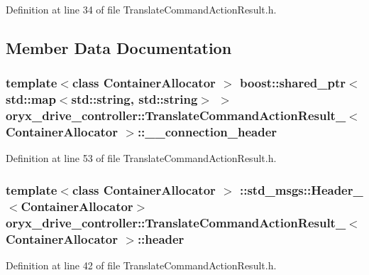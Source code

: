 \-Definition at line 34 of file \-Translate\-Command\-Action\-Result.\-h.



\subsection{\-Member \-Data \-Documentation}
\subsubsection[{\-\_\-\-\_\-connection\-\_\-header}]{\setlength{\rightskip}{0pt plus 5cm}template$<$class Container\-Allocator $>$ boost\-::shared\-\_\-ptr$<$std\-::map$<$std\-::string, std\-::string$>$ $>$ {\bf oryx\-\_\-drive\-\_\-controller\-::\-Translate\-Command\-Action\-Result\-\_\-}$<$ \-Container\-Allocator $>$\-::{\bf \-\_\-\-\_\-connection\-\_\-header}}\label{structoryx__drive__controller_1_1TranslateCommandActionResult___a2de868eddb82fbd2fc2aab0fb01526a1}


\-Definition at line 53 of file \-Translate\-Command\-Action\-Result.\-h.

\subsubsection[{header}]{\setlength{\rightskip}{0pt plus 5cm}template$<$class Container\-Allocator $>$ \-::std\-\_\-msgs\-::\-Header\-\_\-$<$\-Container\-Allocator$>$ {\bf oryx\-\_\-drive\-\_\-controller\-::\-Translate\-Command\-Action\-Result\-\_\-}$<$ \-Container\-Allocator $>$\-::{\bf header}}\label{structoryx__drive__controller_1_1TranslateCommandActionResult___af8632930d7069b17c69b62eaf934c8e6}


\-Definition at line 42 of file \-Translate\-Command\-Action\-Result.\-h.

